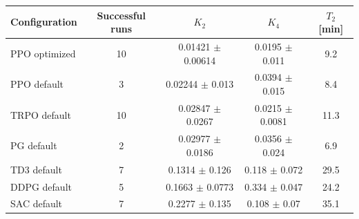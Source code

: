 \begin{tabular}{lcccc}
\toprule
Configuration & Successful runs & $K_2$ & $K_4$ & $T_2$ [min] \\
\midrule
PPO optimized & 10 & 0.01421 $\pm$ 0.00614 & 0.0195 $\pm$ 0.011 & 9.2 \\
PPO default & 3 & 0.02244 $\pm$ 0.013 & 0.0394 $\pm$ 0.015 & 8.4 \\
TRPO default & 10 & 0.02847 $\pm$ 0.0267 & 0.0215 $\pm$ 0.0081 & 11.3 \\
PG default & 2 & 0.02977 $\pm$ 0.0186 & 0.0356 $\pm$ 0.024 & 6.9 \\
TD3 default & 7 & 0.1314 $\pm$ 0.126 & 0.118 $\pm$ 0.072 & 29.5 \\
DDPG default & 5 & 0.1663 $\pm$ 0.0773 & 0.334 $\pm$ 0.047 & 24.2 \\
SAC default & 7 & 0.2277 $\pm$ 0.135 & 0.108 $\pm$ 0.07 & 35.1 \\
\bottomrule
\end{tabular}
